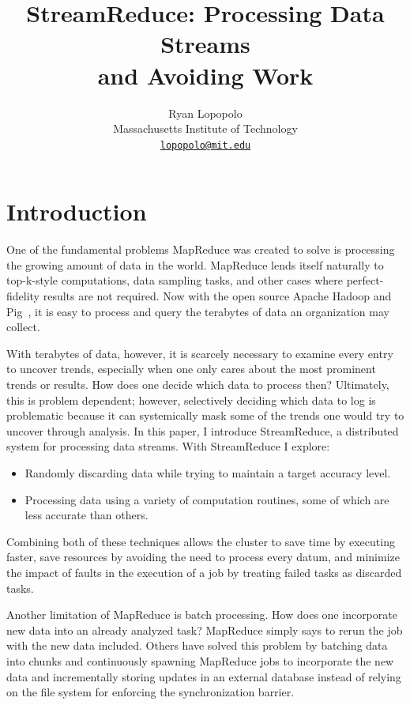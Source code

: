 \documentclass[12pt,twocolumn]{article}
\title{StreamReduce: Processing Data Streams\\and Avoiding Work}
\author{Ryan Lopopolo\\
Massachusetts Institute of Technology\\
\href{mailto:lopopolo@mit.edu}{\texttt{lopopolo@mit.edu}}}
\begin{document}
\maketitle

\section{Introduction}
\label{sec:intro}
One of the fundamental problems MapReduce was created to solve is processing
the growing amount of data in the world.
MapReduce lends itself naturally to top-k-style computations,
data sampling tasks, and other cases where perfect-fidelity results are not required.
Now with the open source Apache Hadoop
and Pig~\cite{Olston:2008:PLN:1376616.1376726}, it is easy to process and query
the terabytes of data an organization may collect.

With terabytes of data, however, it is scarcely necessary to examine
every entry to uncover trends, especially when one only cares about the most prominent
trends or results.
How does one decide which data to process then? Ultimately, this is problem dependent;
however, selectively deciding which data to
log is problematic because it can systemically mask some of the trends one would
try to uncover through analysis. In this paper, I introduce StreamReduce, a distributed
system
for processing data streams. With StreamReduce I explore:
\begin{itemize}
  \item
    Randomly discarding data while trying to maintain a target accuracy level.
  \item
    Processing data using a variety of computation routines, some of which are less
    accurate than others.
\end{itemize}
Combining both of these techniques allows the cluster to save time by executing faster,
save resources by avoiding the need to process every datum, and minimize the impact of
faults
in the execution of a job by treating failed tasks as discarded tasks.

Another limitation of MapReduce is batch processing. How does one
incorporate new data into an already analyzed task? MapReduce simply says to rerun
the job with the new data included. Others have solved this problem by batching data
into chunks and continuously spawning MapReduce jobs to incorporate the new data
and incrementally storing updates in an external database instead of relying on
the file system for enforcing the synchronization barrier.
\end{document}
